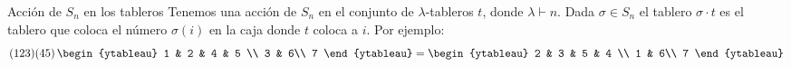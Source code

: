 \documentclass[final,xcolor=svgnames]{beamer}
\DeclareMathOperator{\sgn}{sgn}
\begin{document}
\begin{frame}{}
\begin{columns}
\begin{column}{0.5\textwidth}
      \begin{block}{Acción de $S_{n}$ en los tableros}
        Tenemos una acción de $S_{n}$ en el conjunto de
        $\lambda$-tableros $t$, donde $\lambda\vdash n$.  Dada
        $\sigma\in S_{n}$ el tablero $\sigma\cdot t$ es el tablero que
        coloca el número $\sigma(i)$ en la caja donde $t$ coloca a
        $i$. Por ejemplo:
        \begin{equation*}(123)(45)\,
          \begin{ytableau}
            1 & 2 & 4 & 5 \\
            3 & 6\\
            7
          \end{ytableau}
          =
          \begin{ytableau}
            2 & 3 & 5 & 4 \\
            1 & 6\\
            7
          \end{ytableau}
        \end{equation*}
      \end{block}





\end{column}
\end{columns}
\end{frame}
\end{document}
